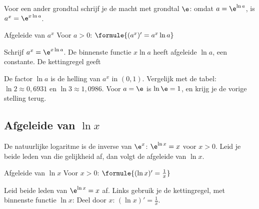 Voor een ander grondtal schrijf je de macht met grondtal $\e$: omdat $a = \e^{\ln a}$, is $a^x = \e^{x \ln a}$.

\begin{theorie}
\begin{stelling}{Afgeleide van \texorpdfstring{$a^x$}{a tot de x}}
Voor $a > 0$: \quad $\formule{(a^x)' = a^x \ln a}$
\end{stelling}
\begin{bewijs}
Schrijf $a^x = \e^{x \ln a}$. De binnenste functie $x \ln a$ heeft afgeleide $\ln a$, een constante. De kettingregel geeft
\end{bewijs}
\end{theorie}

De factor $\ln a$ is de helling van $a^x$ in $(0, 1)$. Vergelijk met de tabel: $\ln 2 \approx 0{,}6931$ en $\ln 3 \approx 1{,}0986$. Voor $a = \e$ is $\ln \e = 1$, en krijg je de vorige stelling terug.


\begin{oefeningen}
\end{oefeningen}

\subsection{Afgeleide van \texorpdfstring{$\ln x$}{ln x}}

De natuurlijke logaritme is de inverse van $\e^x$: $\e^{\ln x} = x$ voor $x > 0$. Leid je beide leden van die gelijkheid af, dan volgt de afgeleide van $\ln x$.

\begin{theorie}
\begin{stelling}{Afgeleide van \texorpdfstring{$\ln x$}{ln x}}
Voor $x > 0$: \quad $\formule{(\ln x)' = \frac{1}{x}}$
\end{stelling}
\begin{bewijs}
Leid beide leden van $\e^{\ln x} = x$ af. Links gebruik je de kettingregel, met binnenste functie $\ln x$:
Deel door $x$: $(\ln x)' = \frac1x$.
\end{bewijs}
\end{theorie}

